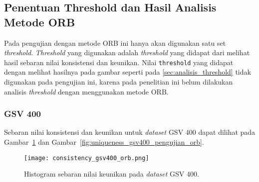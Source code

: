 \subsection{Penentuan Threshold dan Hasil Analisis Metode ORB}
Pada pengujian dengan metode ORB ini hanya akan digunakan satu set \textit{threshold}. \textit{Threshold} yang digunakan adalah \textit{threshold} yang didapat dari melihat hasil sebaran nilai konsistensi dan keunikan. Nilai \texttt{threshold} yang didapat dengan melihat hasilnya pada gambar seperti pada \ref{sec:analisis_threshold} tidak digunakan pada pengujian ini, karena pada penelitian ini belum dilakukan analisis \textit{threshold} dengan menggunakan metode ORB. 

\subsubsection{GSV 400}
Sebaran nilai konsistensi dan keunikan untuk \textit{dataset} GSV 400 dapat dilihat pada Gambar~\ref{fig:consistency_gsv400_pengujian_orb} dan Gambar~\ref{fig:uniqueness_gsv400_pengujian_orb}.
\begin{figure}[H]
	\centering
	\texttt{[image: consistency\_gsv400\_orb.png]}
	\caption{Histogram sebaran nilai keunikan pada \textit{dataset} GSV 400.}
	\label{fig:consistency_gsv400_pengujian_orb}
\end{figure}

